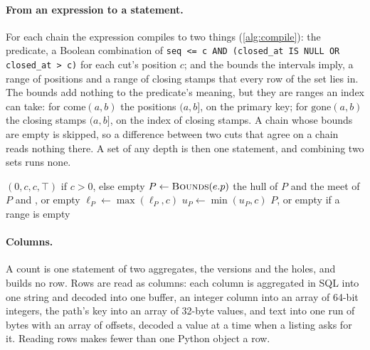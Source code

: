 \documentclass[11pt]{article}
\theoremstyle{plain}
\theoremstyle{definition}
\newcommand{\gone}{\mathrm{gone}}
\newcommand{\come}{\mathrm{come}}
\newcommand{\held}{\mathrm{held}}
\begin{document}
\paragraph{From an expression to a statement.} For each chain the expression compiles to two
things (\cref{alg:compile}): the predicate, a Boolean combination of
\texttt{seq <= c AND (closed\_at IS NULL OR closed\_at > c)} for each cut's position $c$; and the
bounds the intervals imply, a range of positions and a range of closing stamps that every row of
the set lies in. The bounds add nothing to the predicate's meaning, but they are ranges an index
can take: for $\come(a,b)$ the positions $(a, b]$, on the primary key; for $\gone(a,b)$ the closing
stamps $(a, b]$, on the index of closing stamps. A chain whose bounds are empty is skipped, so a
difference between two cuts that agree on a chain reads nothing there. A set of any depth is then
one statement, and combining two sets runs none.

\begin{algorithm}[t]
\caption{The bounds of a set on one chain: positions in $(\ell, h]$, closing stamps in $(d, u]$,
$u = \top$ for an open row.}\label{alg:compile}
\begin{algorithmic}[1]
  \If{$e = \held(c)$} \Return $(0, c, c, \top)$ if $c > 0$, else empty \EndIf
  \State $P \gets \Call{Bounds}{e.p}$
   \Return the hull of $P$ and  \EndIf
   \Return the meet of $P$ and , or empty \EndIf
     $\ell_P \gets \max(\ell_P, c)$\EndIf
     $u_P \gets \min(u_P, c)$\EndIf
  \EndFor
  \State \Return $P$, or empty if a range is empty
\EndFunction
\end{algorithmic}
\end{algorithm}

\paragraph{Columns.} A count is one statement of two aggregates, the versions and the holes, and
builds no row. Rows are read as columns: each column is aggregated in SQL into one string and
decoded into one buffer, an integer column into an array of 64-bit integers, the path's key into
an array of 32-byte values, and text into one run of bytes with an array of offsets, decoded a
value at a time when a listing asks for it. Reading rows makes fewer than one Python object a
row.
\end{document}
